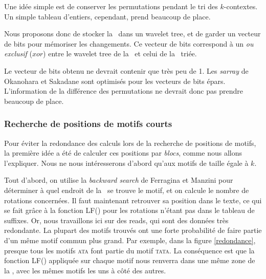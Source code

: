 Une idée simple est de conserver les permutations pendant le tri des $k$-contextes. Un simple tableau d'entiers, cependant, prend beaucoup de place.

Nous proposons donc de stocker la \kbwt\ dans un wavelet tree, et de garder un vecteur de bits pour mémoriser les changements. Ce vecteur de bits correspond à un \textit{ou exclusif} ($xor$) entre le wavelet tree de la \kbwt\ et celui de la \kbwt\ triée.

Le vecteur de bits obtenu ne devrait contenir que très peu de 1. Les \textit{sarray} de Okanohara et Sakadane sont optimisés pour les vecteurs de bits épars. L'information de la différence des permutations ne devrait donc pas prendre beaucoup de place.


\subsubsection{Recherche de positions de motifs courts}
Pour éviter la redondance des calculs lors de la recherche de positions de motifs, la première idée a été de calculer ces positions par \textit{blocs}, comme nous allons l'expliquer. Nous ne nous intéresserons d'abord qu'aux motifs de taille égale à $k$. 

Tout d'abord, on utilise la \textit{backward search} de Ferragina et Manzini pour déterminer à quel endroit de la \kbwt\ se trouve le motif, et on calcule le nombre de rotations concernées. Il faut maintenant retrouver sa position dans le texte, ce qui se fait grâce à la fonction LF() pour les rotations n'étant pas dans le tableau de suffixes. Or, nous travaillons ici sur des reads, qui sont des données très redondante. La plupart des motifs trouvés ont une forte probabilité de faire partie d'un même motif commun plus grand. Par exemple, dans la figure \ref{redondance}, presque tous les motifs \textsc{ata} font partie du motif \textsc{tata}. La conséquence est que la fonction LF() appliquée sur chaque motif nous renverra dans une même zone de la \kbwt, avec les mêmes motifs les uns à côté des autres.

